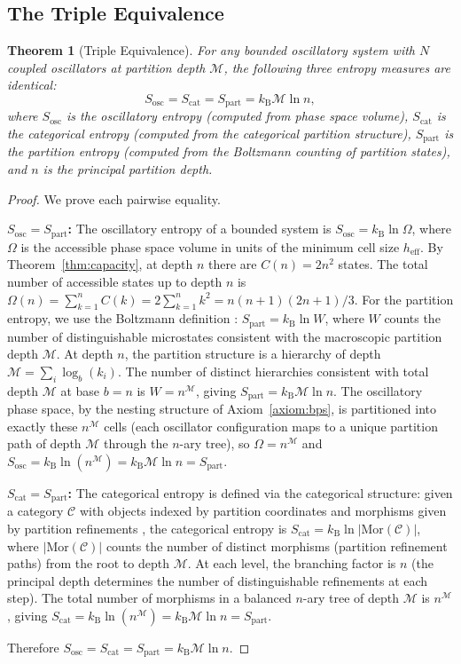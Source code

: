 \documentclass[twocolumn,10pt]{article}
\newtheorem{theorem}{Theorem}[section]
\theoremstyle{remark}
\newcommand{\kB}{k_{\mathrm{B}}}
\newcommand{\Depth}{\mathcal{M}}
\newcommand{\Sosc}{S_{\mathrm{osc}}}
\newcommand{\Scat}{S_{\mathrm{cat}}}
\newcommand{\Spart}{S_{\mathrm{part}}}
\begin{document}
\subsection{The Triple Equivalence}

\begin{theorem}[Triple Equivalence]
\label{thm:triple}
For any bounded oscillatory system with $N$ coupled oscillators at partition depth $\Depth$, the following three entropy measures are identical:
\begin{equation}
\Sosc = \Scat = \Spart = \kB \Depth \ln n,
\label{eq:triple}
\end{equation}
where $\Sosc$ is the oscillatory entropy (computed from phase space volume), $\Scat$ is the categorical entropy (computed from the categorical partition structure), $\Spart$ is the partition entropy (computed from the Boltzmann counting of partition states), and $n$ is the principal partition depth.
\end{theorem}

\begin{proof}
We prove each pairwise equality.

\textbf{$\Sosc = \Spart$:} The oscillatory entropy of a bounded system is $\Sosc = \kB \ln \Omega$, where $\Omega$ is the accessible phase space volume in units of the minimum cell size $h_{\mathrm{eff}}$. By Theorem~\ref{thm:capacity}, at depth $n$ there are $C(n) = 2n^2$ states. The total number of accessible states up to depth $n$ is $\Omega(n) = \sum_{k=1}^{n} C(k) = 2\sum_{k=1}^n k^2 = n(n+1)(2n+1)/3$. For the partition entropy, we use the Boltzmann definition \cite{boltzmann1877}: $\Spart = \kB \ln W$, where $W$ counts the number of distinguishable microstates consistent with the macroscopic partition depth $\Depth$. At depth $n$, the partition structure is a hierarchy of depth $\Depth = \sum_i \log_b(k_i)$. The number of distinct hierarchies consistent with total depth $\Depth$ at base $b = n$ is $W = n^{\Depth}$, giving $\Spart = \kB \Depth \ln n$. The oscillatory phase space, by the nesting structure of Axiom~\ref{axiom:bps}, is partitioned into exactly these $n^{\Depth}$ cells (each oscillator configuration maps to a unique partition path of depth $\Depth$ through the $n$-ary tree), so $\Omega = n^{\Depth}$ and $\Sosc = \kB \ln(n^{\Depth}) = \kB \Depth \ln n = \Spart$.

\textbf{$\Scat = \Spart$:} The categorical entropy is defined via the categorical structure: given a category $\mathcal{C}$ with objects indexed by partition coordinates and morphisms given by partition refinements \cite{maclane1971}, the categorical entropy is $\Scat = \kB \ln |\mathrm{Mor}(\mathcal{C})|$, where $|\mathrm{Mor}(\mathcal{C})|$ counts the number of distinct morphisms (partition refinement paths) from the root to depth $\Depth$. At each level, the branching factor is $n$ (the principal depth determines the number of distinguishable refinements at each step). The total number of morphisms in a balanced $n$-ary tree of depth $\Depth$ is $n^{\Depth}$, giving $\Scat = \kB \ln(n^{\Depth}) = \kB \Depth \ln n = \Spart$.

Therefore $\Sosc = \Scat = \Spart = \kB \Depth \ln n$.
\end{proof}
\end{document}
